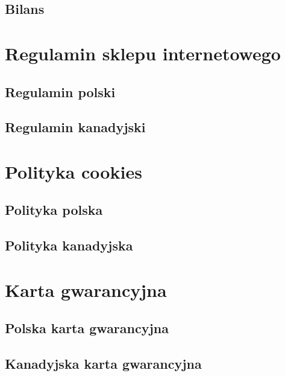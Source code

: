 \documentclass[
12pt, %
a4paper
]{report}
\begin{document}
		\section{Bilans}
			

\appendix

	\chapter{Regulamin sklepu internetowego}
		\section{Regulamin polski}
			
			
		\section{Regulamin kanadyjski}
			

	\chapter{Polityka cookies}
		\section{Polityka polska}
			

			\section{Polityka kanadyjska}
				

	\chapter{Karta gwarancyjna}
		\section{Polska karta gwarancyjna}
			
	
		\section{Kanadyjska karta gwarancyjna}
			
\end{document}
